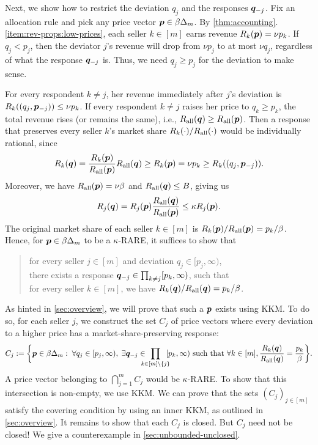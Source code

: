 Next, we show how to restrict the deviation $q_j$ and the responses $\bm{q}_{-j}$.
Fix an allocation rule and pick any price vector $\bm{p} \in \beta\Delta_m$.
By \cref{thm:accounting}.\ref{item:rev-props:low-prices},
each seller $k \in [m]$ earns revenue $R_k(\bm{p}) = \nu p_k$.
If $q_j < p_j$, then the deviator $j$'s revenue will drop from $\nu p_j$ to at most $\nu q_j$,
regardless of what the response $\bm{q}_{-j}$ is.
Thus, we need $q_j \ge p_j$ for the deviation to make sense.

For every respondent $k \neq j$, her revenue immediately after $j$'s deviation is
$R_k((q_j, \bm{p}_{-j})) \le \nu p_k$.
If every respondent $k \neq j$ raises her price to $q_k \ge p_k$,
the total revenue rises (or remains the same), i.e., $R_{\operatorname{all}}(\bm{q}) \ge R_{\operatorname{all}}(\bm{p})$.
Then a response that preserves every seller $k$'s market share $R_k(\cdot)/R_{\operatorname{all}}(\cdot)$
would be individually rational, since
\[ R_k(\bm{q}) = \frac{R_k(\bm{p})}{R_{\operatorname{all}}(\bm{p})} R_{\operatorname{all}}(\bm{q})
    \ge R_k(\bm{p}) = \nu p_k \ge R_k((q_j, \bm{p}_{-j})). \]
Moreover, we have $R_{\operatorname{all}}(\bm{p}) = \nu\beta$ and $R_{\operatorname{all}}(\bm{q}) \le B$, giving us
\[ R_j(\bm{q}) = R_j(\bm{p}) \frac{R_{\operatorname{all}}(\bm{q})}{R_{\operatorname{all}}(\bm{p})} \le \kappa R_j(\bm{p}). \]
The original market share of each seller $k \in [m]$ is $R_k(\bm{p})/R_{\operatorname{all}}(\bm{p}) = p_k/\beta$.
Hence, for $\bm{p} \in \beta\Delta_m$ to be a $\kappa$-RARE, it suffices to show that
\begin{quote}
for every seller $j \in [m]$ and deviation $q_j \in [p_j, \infty)$,
\\ there exists a response $\bm{q}_{-j} \in \prod_{k \neq j} [p_k, \infty)$, such that
\\ for every seller $k \in [m]$, we have $R_k(\bm{q})/R_{\operatorname{all}}(\bm{q}) = p_k/\beta$.
\end{quote}

As hinted in \cref{sec:overview}, we will prove that such a $\bm{p}$ exists using KKM.
To do so, for each seller $j$, we construct the set $C_j$ of price vectors
where every deviation to a higher price has a market-share-preserving response:
\[ C_j \defeq \bigg\{\pvec \in \beta\Delta_m:\; \forall q_j \in [p_j, \infty),\;
    \exists \qvec_{-j} \in \!\!\!\!\!\prod_{k \in [m] \setminus \{j\}} \!\!\! [p_k, \infty) \text{ such that }
    \forall k \in [m], \frac{R_k(\qvec)}{R_{\all}(\qvec)} = \frac{p_k}{\beta} \bigg\}. \]
A price vector belonging to $\bigcap_{j=1}^m C_j$ would be $\kappa$-RARE.
To show that this intersection is non-empty, we use KKM.
We can prove that the sets $(C_j)_{j \in [m]}$ satisfy the covering condition
by using an inner KKM, as outlined in \cref{sec:overview}.
It remains to show that each $C_j$ is closed. But $C_j$ need not be closed!
We give a counterexample in \cref{sec:unbounded-unclosed}.

